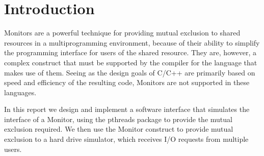 \documentclass{report}
\begin{document}


\tableofcontents %
\newpage
\section{Introduction}
Monitors are a powerful technique for providing mutual exclusion to shared
resources in a multiprogramming environment, because of their ability to simplify the
programming interface for users of the shared resource. They are, however, a complex
construct that must be supported by the compiler for the language that makes use of them.
Seeing as the design goals of C/C++ are primarily based on speed and efficiency of the
resulting code, Monitors are not supported in these languages. 

In this report we design and implement a software interface that simulates the interface
of a Monitor, using the pthreads package to provide the mutual exclusion required. We then
use the Monitor construct to provide mutual exclusion to a hard drive simulator, which
receives I/O requests 
from multiple users.
\end{document}
